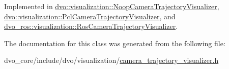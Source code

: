 Implemented in \mbox{\hyperlink{classdvo_1_1visualization_1_1_noop_camera_trajectory_visualizer_a73cd3c7ed8a3817c5f6d480d97aa24c5}{dvo\+::visualization\+::\+Noop\+Camera\+Trajectory\+Visualizer}}, \mbox{\hyperlink{classdvo_1_1visualization_1_1_pcl_camera_trajectory_visualizer_ad0ea0d8feefef54cd5dc15cd483b3610}{dvo\+::visualization\+::\+Pcl\+Camera\+Trajectory\+Visualizer}}, and \mbox{\hyperlink{classdvo__ros_1_1visualization_1_1_ros_camera_trajectory_visualizer_a3a015885211d1dfac2441ab5f0e26af5}{dvo\+\_\+ros\+::visualization\+::\+Ros\+Camera\+Trajectory\+Visualizer}}.



The documentation for this class was generated from the following file\+:\begin{DoxyCompactItemize}
\item 
dvo\+\_\+core/include/dvo/visualization/\mbox{\hyperlink{camera__trajectory__visualizer_8h}{camera\+\_\+trajectory\+\_\+visualizer.\+h}}\end{DoxyCompactItemize}
